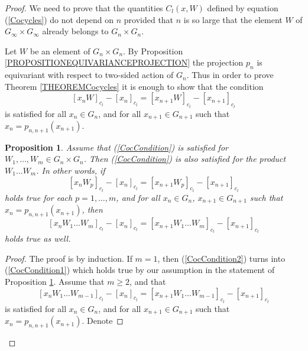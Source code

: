 \documentclass[10pt,a4paper]{amsart}
\newtheorem{prop}{Proposition}
\begin{document}
\begin{proof}We need to prove that the quantities $C_l(x,W)$ defined by equation (\ref{Cocycles}) do not depend on $n$ provided that $n$ is so large that
the element $W$ of $G_{\infty}\times G_{\infty}$ already belongs to $G_n\times G_n$.



Let $W$ be an element of $G_n\times G_n$. By Proposition \ref{PROPOSITIONEQUIVARIANCEPROJECTION} the projection $p_n$ is equivariant with respect to two-sided action of $G_n$. Thus in order to
prove Theorem \ref{THEOREMCocycles} it is enough to show that the condition
\begin{equation}\label{CocCondition}
\left[x_nW\right]_{c_l}-\left[x_n\right]_{c_l}=\left[x_{n+1}W\right]_{c_l}-\left[x_{n+1}\right]_{c_l}
\end{equation}
is satisfied for all $x_n\in G_n$, and for all $x_{n+1}\in G_{n+1}$ such that $x_n=p_{n,n+1}\left(x_{n+1}\right)$.
\begin{prop}\label{PROPOSITIONCoW}Assume that (\ref{CocCondition}) is satisfied for $W_1,\ldots, W_m\in G_n\times G_n$. Then
(\ref{CocCondition}) is also satisfied for the product $W_1\ldots W_m$. In other words, if
\begin{equation}\label{CocCondition1}
\left[x_nW_p\right]_{c_l}-\left[x_n\right]_{c_l}=\left[x_{n+1}W_p\right]_{c_l}-\left[x_{n+1}\right]_{c_l}
\end{equation}
holds true for each $p=1,\ldots,m$,  and for all $x_n\in G_n$, $x_{n+1}\in G_{n+1}$ such that $x_n=p_{n,n+1}\left(x_{n+1}\right)$, then
\begin{equation}\label{CocCondition2}
\left[x_nW_1\ldots W_m\right]_{c_l}-\left[x_n\right]_{c_l}=\left[x_{n+1}W_1\ldots W_m\right]_{c_l}-\left[x_{n+1}\right]_{c_l}
\end{equation}
holds true as well.
\end{prop}
\begin{proof} The proof is by induction. If $m=1$, then (\ref{CocCondition2}) turns into
(\ref{CocCondition1}) which holds true by our assumption in the statement of Proposition \ref{PROPOSITIONCoW}.
Assume that $m\geq 2$, and that
\begin{equation}\label{CocCondition3}
\left[x_nW_1\ldots W_{m-1}\right]_{c_l}-\left[x_n\right]_{c_l}=\left[x_{n+1}W_1\ldots W_{m-1}\right]_{c_l}-\left[x_{n+1}\right]_{c_l}
\end{equation}
is satisfied for  all $x_n\in G_n$, and for all $x_{n+1}\in G_{n+1}$ such that $x_n=p_{n,n+1}\left(x_{n+1}\right)$.
Denote

\end{proof}
\end{proof}
\end{document}
